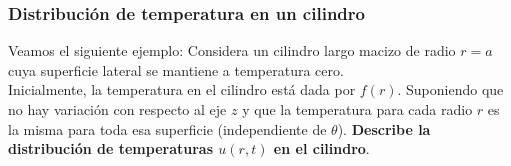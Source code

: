 \documentclass[12pt]{beamer}
\begin{document}
\begin{frame}
\frametitle{Distribución de temperatura en un cilindro}
Veamos el siguiente ejemplo: \pause Considera un cilindro largo macizo de radio $r = a$ cuya superficie lateral se mantiene a temperatura cero.
\\
\bigskip
\pause
Inicialmente, la temperatura en el cilindro está dada por $f(r)$. \pause Suponiendo que no hay variación con respecto al eje $z$ y que la temperatura para cada radio $r$ es la misma para toda esa superficie (independiente de $\theta$). \pause \textbf{Describe la distribución de temperaturas $u(r, t)$ en el cilindro}.
\end{frame}
\end{document}
